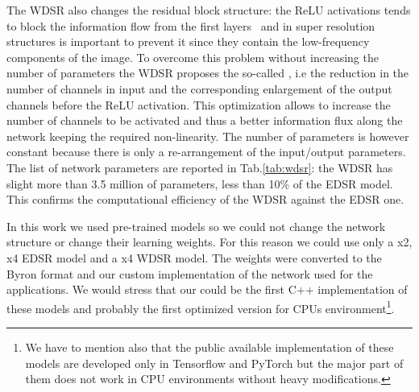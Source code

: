 \documentclass{standalone}
\begin{document}
The WDSR also changes the residual block structure: the ReLU activations tends to block the information flow from the first layers~\cite{mobilenet} and in super resolution structures is important to prevent it since they contain the low-frequency components of the image.
To overcome this problem without increasing the number of parameters the WDSR proposes the so-called , i.e the reduction in the number of channels in input and the corresponding enlargement of the output channels before the ReLU activation.
This optimization allows to increase the number of channels to be activated and thus a better information flux along the network keeping the required non-linearity.
The number of parameters is however constant because there is only a re-arrangement of the input/output parameters.
The list of network parameters are reported in Tab.\ref{tab:wdsr}: the WDSR has slight more than 3.5 million of parameters, less than 10\% of the EDSR model.
This confirms the computational efficiency of the WDSR against the EDSR one.

In this work we used pre-trained models so we could not change the network structure or change their learning weights.
For this reason we could use only a x2, x4 EDSR model and a x4 WDSR model.
The weights were converted to the \textsf{Byron} format and our custom implementation of the network used for the applications.
We would stress that our could be the first \textsf{C++} implementation of these models and probably the first optimized version for CPUs environment\footnote{
  We have to mention also that the public available implementation of these models are developed only in \textsf{Tensorflow} and \textsf{PyTorch} but the major part of them does not work in CPU environments without heavy modifications.
}.
\end{document}
